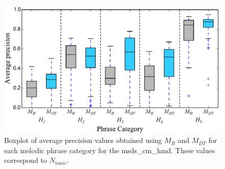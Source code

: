 \begin{figure}
	\begin{center}
		\includegraphics[width=\figSizeEightyFive]{ch06_patterns/figures/ImprovingSimilarity/HindustaniPerCategoryPerformance_BOXPLOT.pdf}
	\end{center}
	\caption{Boxplot of average precision values obtained using $M_{B}$ and $M_{DT}$ for each melodic phrase category for the \acrshort{msds_cm_hmd}. These values correspond to $N_{tonic}$.} 
	\label{fig:hinudstaniPerCategoryPerformance}
\end{figure}


